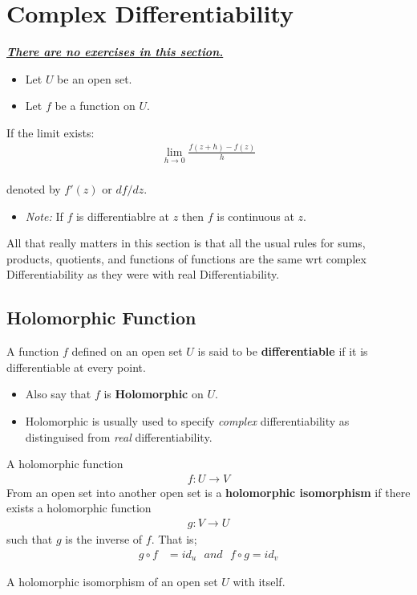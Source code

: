 \section{Complex Differentiability}
\underline{{\textit{\textbf{There are no exercises in this section.}}}}

\begin{itemize}
	\item Let $U$ be an open set.
	\item Let $f$ be a function on $U.$
\end{itemize}

\begin{defn}
	If the limit exists:
	\begin{align*}
		\lim_{h \to 0} \frac{f(z + h) - f(z)}{h} \\
	\end{align*}


	denoted by $f'(z)$ or $df/dz.$
\end{defn}
\begin{itemize}
	\item \textit{Note:} If $f$ is differentiablre at $z$ then $f$ is continuous at $z.$
\end{itemize}

All that really matters in this section
is that all the usual rules for sums, products, quotients, and functions of functions are the same
wrt complex Differentiability as they were with real Differentiability.

\subsection{Holomorphic Function}
A function $f$ defined on an open set $U$ is said to be \textbf{differentiable} if it is differentiable at every point.
\begin{itemize}
	\item Also say that $f$ is \textbf{Holomorphic} on $U.$
	\item Holomorphic is usually used to specify \textit{complex} differentiability as distinguised from \textit{real} differentiability.
\end{itemize}


\begin{defn}
	A holomorphic function
	\begin{align*}
		f: U \to V
	\end{align*}
	From an open set into another open set is a \textbf{holomorphic isomorphism} if there exists a holomorphic function
	\begin{align*}
		g: V \to U
	\end{align*}
	such that $g$ is the inverse of $f.$ That is;
	\begin{align*}
		g \circ f & = id_u \,\,\,\,
		and \,\,\,\,
		f \circ g = id_v
	\end{align*}
\end{defn}

\begin{defn}
	A holomorphic isomorphism of an open set $U$ with itself.
\end{defn}
\newpage